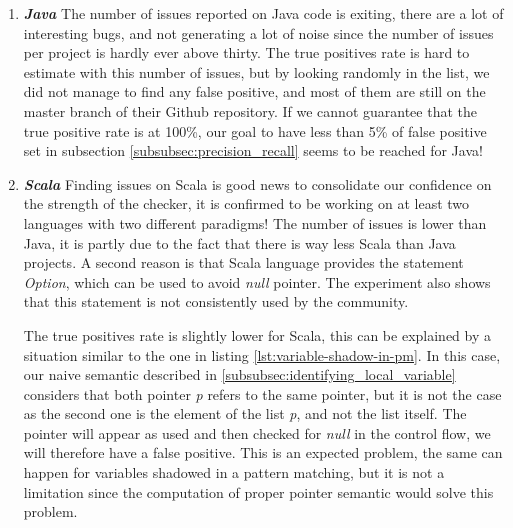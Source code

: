 \begin{enumerate}
	\item \textbf{\textit{Java}} \newline
	The number of issues reported on Java code is exiting, there are a lot of interesting bugs, and not generating a lot of noise since the number of issues per project is hardly ever above thirty.
	The true positives rate is hard to estimate with this number of issues, but by looking randomly in the list, we did not manage to find any false positive, and most of them are still on the master branch of their Github repository. 
	If we cannot guarantee that the true positive rate is at 100\%, our goal to have less than 5\% of false positive set in subsection \ref{subsubsec:precision_recall} seems to be reached for Java!
    \newline
	\item \textbf{\textit{Scala}} \newline
	Finding issues on Scala is good news to consolidate our confidence on the strength of the checker, it is confirmed to be working on at least two languages with two different paradigms!
	The number of issues is lower than Java, it is partly due to the fact that there is way less Scala than Java projects.
	A second reason is that Scala language provides the statement \emph{Option}, which can be used to avoid \emph{null} pointer.
	The experiment also shows that this statement is not consistently used by the community.
	
	
	
	The true positives rate is slightly lower for Scala, this can be explained by a situation similar to the one in listing \ref{lst:variable-shadow-in-pm}. 
	In this case, our naive semantic described in \ref{subsubsec:identifying_local_variable} considers that both pointer \emph{p} refers to the same pointer, but it is not the case as the second one is the element of the list \emph{p}, and not the list itself.
	The pointer will appear as used and then checked for \emph{null} in the control flow, we will therefore have a false positive.
	This is an expected problem, the same can happen for variables shadowed in a pattern matching, but it is not a limitation since the computation of proper pointer semantic would solve this problem.
	

\end{enumerate}
